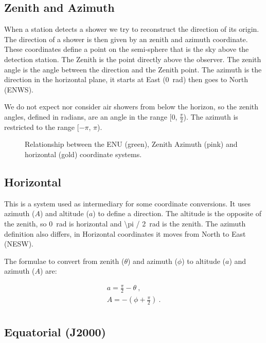 \subsection{Zenith and Azimuth}

When a station detects a shower we try to reconstruct the direction of
its origin. The direction of a shower is then given by an zenith and
azimuth coordinate. These coordinates define a point on the semi-sphere
that is the sky above the detection station. The Zenith is the point
directly above the observer. The zenith angle is the angle between the
direction and the Zenith point. The azimuth is the direction in the
horizontal plane, it starts at East (\SI{0}{\radian}) then goes to North
(ENWS).

We do not expect nor consider air showers from below the horizon, so the
zenith angles, defined in radians, are an angle in the range [0,
$\frac{\pi}{2}$). The azimuth is restricted to the range [$-\pi$, $\pi$).

\begin{figure}
    \centering
    
    \caption{Relationship between the ENU (green), Zenith Azimuth (pink)
             and horizontal (gold) coordinate systems.}
    \label{fig:enu_horizontal}
\end{figure}


\subsection{Horizontal}

This is a system used as intermediary for some coordinate conversions.
It uses azimuth ($A$) and altitude ($a$) to define a direction. The
altitude is the opposite of the zenith, so \SI{0}{\radian} is horizontal
and \SI{\pi / 2}{\radian} is the zenith. The azimuth definition also
differs, in Horizontal coordinates it moves from North to East (NESW).

The formulae to convert from zenith ($\theta$) and azimuth ($\phi$) to
altitude ($a$) and azimuth ($A$) are:

\begin{equation}
    \begin{array}{l}
        a = \frac{\pi}{2} - \theta \ , \\
        A = - (\phi + \frac{\pi}{2}) \ . \\
    \end{array}
\end{equation}


\subsection{Equatorial (J2000)}

